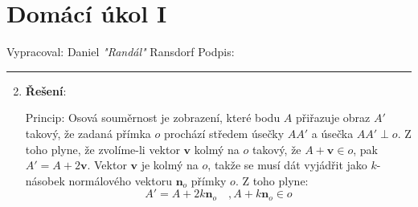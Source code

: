 \documentclass[12pt]{article}
\begin{document}
\section*{Domácí úkol I}

Vypracoval: Daniel \textit{"Randál"} Ransdorf \hfill Podpis: \rule{4cm}{0.4pt}

\begin{enumerate}
  \setcounter{enumi}{1}

  \item \textbf{Řešení}:
    
    Princip: Osová souměrnost je zobrazení, které bodu $A$ přiřazuje obraz $A'$ takový,
    že zadaná přímka $o$ prochází středem úsečky $AA'$ a úsečka $AA' \perp o$.
    Z toho plyne, že zvolíme-li vektor $\mathbf{v}$ kolmý na $o$ takový, že $A+\mathbf{v} \in o$, pak $A' = A+2\mathbf{v}$.
    Vektor $\mathbf{v}$ je kolmý na $o$, takže se musí dát vyjádřit jako $k$-násobek normálového vektoru $\mathbf{n}_o$ přímky $o$.
    Z toho plyne:
    \[
      A' = A + 2k\mathbf{n}_o \quad , A + k\mathbf{n}_o \in o
    \]
    

\end{enumerate}
\end{document}
